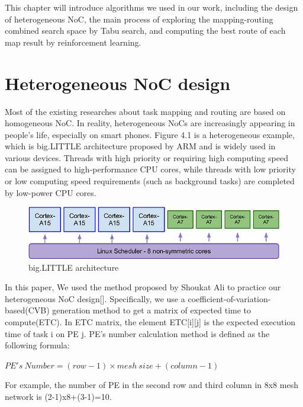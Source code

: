 This chapter will introduce algorithms we used in our work, including the design of heterogeneous NoC, the main process of exploring the mapping-routing combined search space by Tabu search, and computing the best route of each map result by reinforcement learning.

\section{Heterogeneous NoC design}
Most of the existing researches about task mapping and routing are based on homogeneous NoC.
In reality, heterogeneous NoCs are increasingly appearing in people’s life, especially on smart phones. Figure 4.1 is a heterogeneous example, which is big.LITTLE architecture proposed by ARM and is widely used in various devices. Threads with high priority or requiring high computing speed can be assigned to high-performance CPU cores, while threads with low priority or low computing speed requirements (such as background tasks) are completed by low-power CPU cores.

\begin{figure}
    \centering
    \includegraphics[]{../Figures/big_little.jpg}
    \caption{big.LITTLE architecture}
\end{figure}


In this paper, We used the method proposed by Shoukat Ali to practice our heterogeneous NoC design[]. Specifically, we use a coefficient-of-variation-based(CVB) generation method to get a matrix of expected time to compute(ETC). In ETC matrix, the element ETC[i][j] is the expected execution time of task i on PE j. PE's number calculation method is defined as the following formula:
\begin{center}
    $PE's\ Number=(row-1) \times mesh\ size + (column-1)$
\end{center}
For example, the number of PE in the second row and third column in 8x8 mesh network is (2-1)x8+(3-1)=10. 


